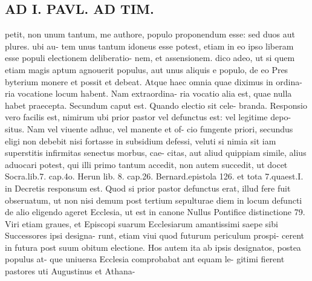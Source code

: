 \documentclass{article}
\begin{document}
\begin{pages}
\section*{AD I. PAVL. AD TIM. }petit, non unum tantum, me authore, populo proponendum esse: sed duos aut plures. ubi au- tem unus tantum idoneus esse potest, etiam in eo ipso liberam esse populi electionem deliberatio- nem, et assensionem. dico adeo, ut si quem etiam magis aptum agnouerit populus, aut unus aliquis e populo, de eo Pres byterium monere et possit et debeat. Atque haec omnia quae diximus in ordina- ria vocatione locum habent. Nam extraordina- ria vocatio alia est, quae nulla habet praecepta. Secundum caput est. Quando electio sit cele- branda. Responsio vero facilis est, nimirum ubi prior pastor vel defunctus est: vel legitime depo- situs. Nam vel viuente adhuc, vel manente et of- cio fungente priori, secundus eligi non debebit nisi fortasse in subsidium defessi, veluti si nimia sit iam superstitis infirmitas senectus morbus, cae- citas, aut aliud quippiam simile, alius aduocari potest, qui illi primo tantum accedit, non autem succedit, ut docet Socra.lib.7. cap.4o. Herun lib. 8. cap.26. Bernard.epistola 126. et tota 7.quaest.I. in Decretis responsum est. Quod si prior pastor defunctus erat, illud fere fuit obseruatum, ut non nisi demum post tertium sepulturae diem in locum defuncti de alio eligendo ageret Ecclesia, ut est in canone Nullus Pontifice distinctione 79. Viri etiam graues, et Episcopi suarum Ecclesiarum amantissimi saepe sibi Successores ipsi designa- runt, etiam viui quod futurum periculum prospi- cerent in futura post suum obitum electione. Hos autem ita ab ipsis designatos, postea populus at- que uniuersa Ecclesia comprobabat ant equam le- gitimi fierent pastores uti Augustinus et Athana- 

\end{pages}
\end{document}
